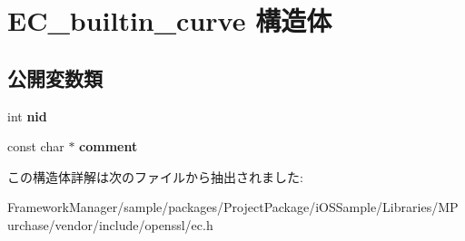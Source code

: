 \hypertarget{struct_e_c__builtin__curve}{}\section{E\+C\+\_\+builtin\+\_\+curve 構造体}
\label{struct_e_c__builtin__curve}
\subsection*{公開変数類}
\begin{DoxyCompactItemize}
\item 
\hypertarget{struct_e_c__builtin__curve_a31dc38a7d4ada38cd9249b87fb5d8f20}{}int {\bfseries nid}\label{struct_e_c__builtin__curve_a31dc38a7d4ada38cd9249b87fb5d8f20}

\item 
\hypertarget{struct_e_c__builtin__curve_a1c394e4731adad55a8fdc5ed25400ab1}{}const char $\ast$ {\bfseries comment}\label{struct_e_c__builtin__curve_a1c394e4731adad55a8fdc5ed25400ab1}

\end{DoxyCompactItemize}


この構造体詳解は次のファイルから抽出されました\+:\begin{DoxyCompactItemize}
\item 
Framework\+Manager/sample/packages/\+Project\+Package/i\+O\+S\+Sample/\+Libraries/\+M\+Purchase/vendor/include/openssl/ec.\+h\end{DoxyCompactItemize}
